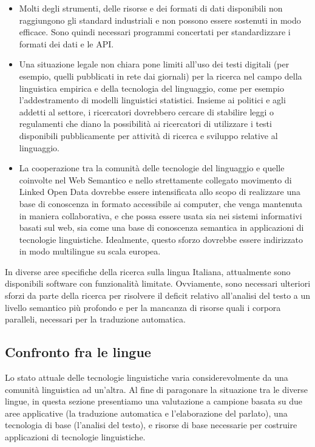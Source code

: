 \documentclass[]{../../metanetpaper}
\begin{document}
\begin{multicols}{2}
\begin{itemize}
\item Molti degli strumenti, delle risorse e dei formati di dati disponibili non raggiungono gli standard industriali e non possono essere sostenuti in modo efficace. Sono quindi necessari programmi concertati per standardizzare i formati dei dati e le API.
\item Una situazione legale non chiara pone limiti all'uso dei testi digitali (per esempio, quelli pubblicati in rete dai giornali) per la ricerca nel campo della  linguistica empirica e della tecnologia del linguaggio, come per esempio l'addestramento di modelli linguistici statistici. Insieme ai politici e agli addetti al settore, i ricercatori dovrebbero cercare di stabilire leggi o regulamenti che diano la possibilit\`{a} ai ricercatori di utilizzare i testi disponibili pubblicamente per attivit\`{a} di ricerca e sviluppo relative al linguaggio.
\item La cooperazione tra la comunit\`{a} delle tecnologie del linguaggio e quelle coinvolte nel Web Semantico e nello strettamente collegato movimento di Linked Open Data dovrebbe essere intensificata allo scopo di realizzare una base di conoscenza in formato accessibile ai computer, che venga mantenuta in maniera collaborativa, e che possa essere usata sia nei sistemi informativi basati sul web, sia come una base di conoscenza semantica in applicazioni di tecnologie linguistiche. Idealmente, questo sforzo dovrebbe essere indirizzato in modo multilingue su scala europea.
\end{itemize}

In diverse aree specifiche della ricerca sulla lingua Italiana, attualmente sono disponibili software con funzionalit\`{a} limitate. Ovviamente, sono necessari ulteriori sforzi da parte della ricerca per risolvere il deficit relativo all'analisi del testo a un livello semantico pi\`{u} profondo e per la mancanza di risorse quali i corpora paralleli, necessari per la traduzione automatica.





\subsection{Confronto fra le lingue}

Lo stato attuale delle tecnologie linguistiche varia considerevolmente da una
comunit\`{a} linguistica ad un'altra. Al fine di paragonare la situazione tra
le diverse lingue, in questa sezione presentiamo una valutazione a campione
basata su due aree applicative (la traduzione automatica e l'elaborazione del
parlato), una tecnologia di base (l'analisi del testo), e  risorse di base
necessarie per costruire applicazioni di tecnologie linguistiche.




\end{multicols}
\end{document}
